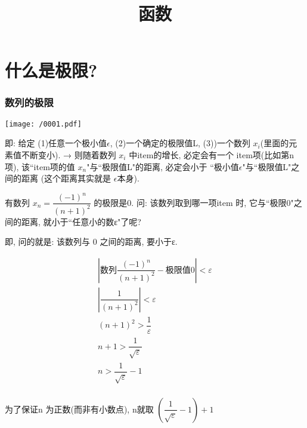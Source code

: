 \documentclass[UTF8]{ctexart}
\title{函数}
\begin{document}
	\tableofcontents %
	\maketitle  %



\part{什么是极限?}

\section{数列的极限}

\texttt{[image: /0001.pdf]}

即: 给定 (1)任意一个极小值$\epsilon $, (2)一个确定的极限值L, (3))一个数列 $ x_i $(里面的元素值不断变小). → 则随着数列 
$ x_i $ 中item的增长, 必定会有一个 item项(比如第n项), 该``item项的值 $ x_n$"与``极限值L"的距离, 必定会小于 ``极小值$\epsilon $"与``极限值L"之间的距离 (这个距离其实就是 $\epsilon $本身). \\



\begin{tcolorbox}[title = {例},boxrule={0.1em},colframe={black!10}, colback={black!3},colbacktitle={black!10},coltitle={black}]
	有数列 $x_n=\dfrac{(-1)^n} {(n+1)^2} $  的极限是0.  问: 该数列取到哪一项item 时, 它与``极限0"之间的距离, 就小于``任意小的数ε"了呢?
	
	即, 问的就是: 该数列与 0 之间的距离, 要小于ε.
	
	
	\[
		\begin{matrix}
			\left| \text{数列}\dfrac{\left( -1 \right) ^n}{\left( n+1 \right) ^2}-\text{极限值}0 \right|<\varepsilon\\
			\left| \dfrac{1}{\left( n+1 \right) ^2} \right|<\varepsilon\\
			\left( n+1 \right) ^2>\dfrac{1}{\varepsilon}\\
			n+1>\dfrac{1}{\sqrt{\varepsilon}}\\
			n>\dfrac{1}{\sqrt{\varepsilon}}-1\\
		\end{matrix}
	\]
	
	为了保证n 为正数(而非有小数点), n就取 $\left( \dfrac{1}{\sqrt{\varepsilon}}-1 \right) +1$	
\end{tcolorbox}
\end{document}
